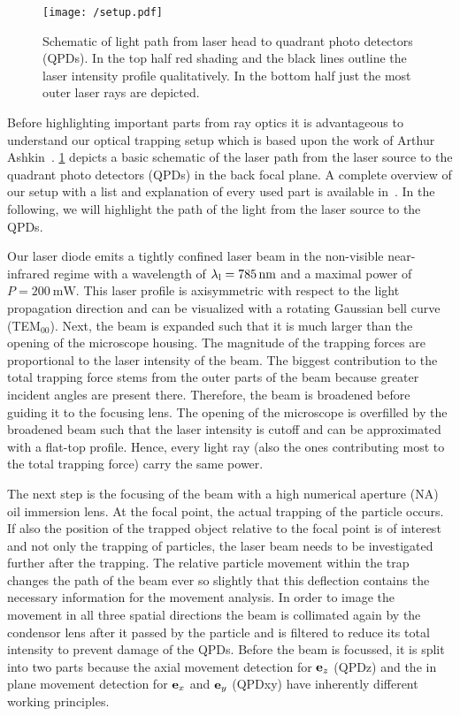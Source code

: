 \begin{figure}[tbp]
  \centering
  \texttt{[image: /setup.pdf]}
  \caption{Schematic of light path from laser head to quadrant photo detectors 
  (QPDs). In the top half red shading and the black lines outline the laser 
intensity profile qualitatively. In the bottom half just the most outer laser 
rays are depicted.}
  \label{fig:TO-setup}
\end{figure}

Before highlighting important parts from ray optics it is advantageous to 
understand our optical trapping setup which is based upon the work of Arthur 
Ashkin~\cite{Ashkin1978,Ashkin1987,Ashkin2002,Ashkin1986,Ashkin1992,Ashkin1997}. 
\cref{fig:TO-setup} depicts a basic schematic of the laser path from the laser 
source to the quadrant photo detectors (QPDs) in the back focal plane. A 
complete overview of our setup with a list and explanation of every used part 
is available in~\cite{Lamprecht2017}. In the following, we will highlight the 
path of the light from the laser source to the QPDs.

Our laser diode emits a tightly confined laser beam in the non-visible 
near-infrared regime with a wavelength of $\lal=\SI{785}{\nm}$ and a maximal 
power of $P=\SI{200}{\milli\watt}$. This laser profile is axisymmetric with 
respect to the light propagation direction and can be visualized with a 
rotating Gaussian bell curve (TEM$_{00}$). Next, the beam is expanded such 
that it is much larger than the opening of the microscope housing. The 
magnitude of the trapping forces are proportional to the laser intensity of the 
beam. The biggest contribution to the total trapping force stems from the outer 
parts of the beam because greater incident angles are present there. Therefore, 
the beam is broadened before guiding it to the focusing lens. The opening of 
the microscope is overfilled by the broadened beam such that the laser 
intensity is cutoff and can be approximated with a flat-top profile. Hence, 
every light ray (also the ones contributing most to the total trapping force) 
carry the same power.

The next step is the focusing of the beam with a high numerical aperture (NA) 
oil immersion lens. At the focal point, the actual trapping of the particle 
occurs. If also the position of the trapped object relative to the focal point 
is of interest and not only the trapping of particles, the laser beam needs to 
be investigated further after the trapping. The relative particle movement 
within the trap changes the path of the beam ever so slightly that this 
deflection contains the necessary information for the movement analysis. In 
order to image the movement in all three spatial directions the beam is 
collimated again by the condensor lens after it passed by the particle and is 
filtered to reduce its total intensity to prevent damage of the QPDs. Before 
the beam is focussed, it is split into two parts because the axial movement 
detection for $\vb{e}_{z}$ (QPDz) and the in plane movement detection for $\vb{e}_{x}$ and 
$\vb{e}_{y}$ (QPDxy) have inherently different working principles.

